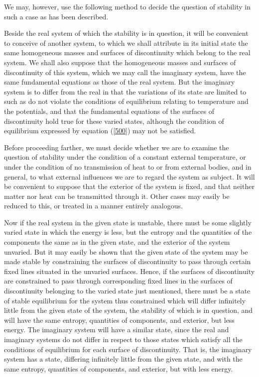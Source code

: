 \documentclass[12pt]{article}
\begin{document}
{We may, however, use the following method to decide the question of stability in such a case as has been described.

Beside the real system of which the stability is in question, it will be convenient to conceive of another system, to which we shall attribute in its initial state the same homogeneous masses and surfaces of discontinuity which belong to the real system. We shall also suppose that the homogeneous masses and surfaces of discontinuity of this system, which we may call the imaginary system, have the same fundamental equations as those of the real system. But the imaginary system is to differ from the real in that the variations of its state are limited to such as do not violate the conditions of equilibrium relating to temperature and the potentials, and that the fundamental equations of the surfaces of discontinuity hold true for these varied states, although the condition of equilibrium expressed by equation (\ref{500}) may not be satisfied.

Before proceeding farther, we must decide whether we are to examine the question of stability under the condition of a constant external temperature, or under the condition of no transmission of heat to or from external bodies, and in general, to what external influences we are to regard the system as subject. It will be convenient to suppose that the exterior of the system is fixed, and that neither matter nor heat can be transmitted through it. Other cases may easily be reduced to this, or treated in a manner entirely analogous.

Now if the real system in the given state is unstable, there must be some slightly varied state in which the energy is less, but the entropy and the quantities of the components the same as in the given state, and the exterior of the system unvaried. But it may easily be shown that the given state of the system may be made stable by constraining the surfaces of discontinuity to pass through certain fixed lines situated in the unvaried surfaces. Hence, if the surfaces of discontinuity are constrained to pass through corresponding fixed lines in the surfaces of discontinuity belonging to the varied state just mentioned, there must be a state of stable equilibrium for the system thus constrained which will differ infinitely little from the given state of the system, the stability of which is in question, and will have the same entropy, quantities of components, and exterior, but less energy. The imaginary system will have a similar state, since the real and imaginary systems do not differ in respect to those states which satisfy all the conditions of equilibrium for each surface of discontinuity. That is, the imaginary system has a state, differing infinitely little from the given state, and with the same entropy, quantities of components, and exterior, but with less energy.

}
\end{document}

